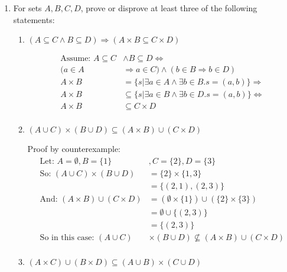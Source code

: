 \documentclass[10pt,\jkfside,a4paper]{article}
\begin{document}
\begin{enumerate}
\item For sets $A, B, C, D$, prove or disprove at least three of the following statements:

\begin{enumerate}

\item $(A \subseteq C \wedge B \subseteq D) \Longrightarrow (A \times B \subseteq C \times D)$

\begin{equation}
\begin{split}
\text{Assume: } A \subseteq C &\wedge B \subseteq D \Longleftrightarrow\\
				(a \in A &\Longrightarrow a \in C) \wedge (b \in B \Longrightarrow b \in D)\\
A \times B &= \{s| \exists a \in A \wedge \exists b \in B. s = (a, b)\} \Longrightarrow\\
A \times B &\subseteq \{s| \exists a \in B \wedge \exists b \in D. s = (a, b)\}\Longleftrightarrow\\
A \times B &\subseteq C \times D\\
\end{split}
\end{equation}

\item $(A \cup C) \times (B \cup D) \subseteq (A \times B) \cup (C \times D)$

Proof by counterexample:
\begin{equation}
\begin{split}
\text{Let: } A = \emptyset, B = \{1\}&, C = \{2\}, D = \{3\}\\
\text{So: } (A \cup C) \times (B \cup D) &= \{2\} \times \{1, 3\} \\
										 &= \{(2, 1), (2, 3)\}\\
\text{And: } (A \times B) \cup (C \times D) &= (\emptyset \times \{1\}) \cup (\{2\} \times \{3\})\\
											&= \emptyset \cup \{(2, 3)\}\\
											&= \{(2, 3)\}\\
\text{So in this case: } (A \cup C) &\times (B \cup D) \nsubseteq (A \times B) \cup (C \times D)\\
\end{split}
\end{equation}

\item $(A \times C) \cup (B \times D) \subseteq (A \cup B) \times (C \cup D)$


\end{enumerate}
\end{enumerate}
\end{document}
